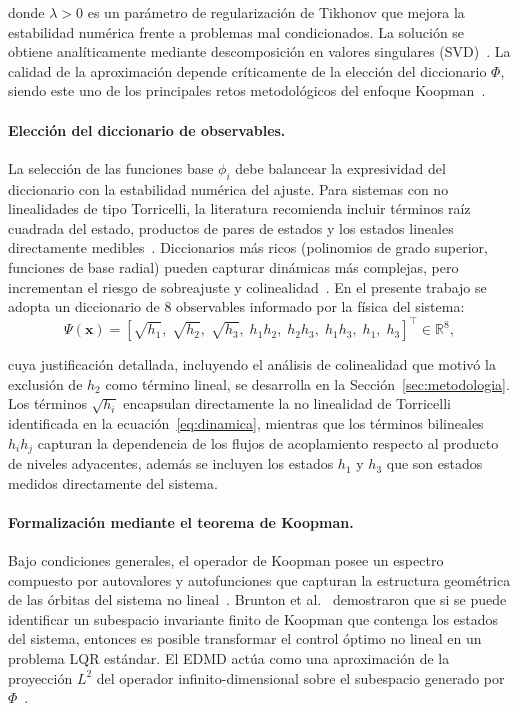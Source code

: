 \documentclass[12pt,letterpaper]{article}
\begin{document}
donde $\lambda > 0$ es un parámetro de regularización de Tikhonov que mejora la
estabilidad numérica frente a problemas mal condicionados. La solución se obtiene
analíticamente mediante descomposición en valores singulares (SVD)~\cite{schmid2010}.
La calidad de la aproximación depende críticamente de la elección del diccionario
$\Phi$, siendo este uno de los principales retos metodológicos del enfoque
Koopman~\cite{garciarev2025}.

\paragraph{Elección del diccionario de observables.}
La selección de las funciones base $\phi_i$ debe balancear la expresividad del
diccionario con la estabilidad numérica del ajuste. Para sistemas con no
linealidades de tipo Torricelli, la literatura recomienda incluir términos raíz
cuadrada del estado, productos de pares de estados y los estados lineales
directamente medibles~\cite{korda2018, aponte2024}. Diccionarios más ricos
(polinomios de grado superior, funciones de base radial) pueden capturar dinámicas
más complejas, pero incrementan el riesgo de sobreajuste y
colinealidad~\cite{garciarev2025}. En el presente trabajo se adopta un diccionario de
8 observables informado por la física del sistema:
\begin{equation}
\Psi(\mathbf{x}) = \left[ \sqrt{h_1},\; \sqrt{h_2},\; \sqrt{h_3},\; h_1h_2,\; h_2h_3,\; h_1h_3,\; h_1,\; h_3 \right]^\top \in \mathbb{R}^8,
\label{eq:psi_dict}
\end{equation}

cuya justificación detallada, incluyendo el análisis de colinealidad que motivó la
exclusión de $h_2$ como término lineal, se desarrolla en la
Sección~\ref{sec:metodologia}. Los términos $\sqrt{h_i}$ encapsulan directamente la
no linealidad de Torricelli identificada en la
ecuación~\eqref{eq:dinamica}, mientras que los términos bilineales $h_ih_j$ capturan
la dependencia de los flujos de acoplamiento respecto al producto de niveles
adyacentes, además se incluyen los estados $h_1$  y $h_3$ que son estados medidos directamente del sistema.

\paragraph{Formalización mediante el teorema de Koopman.}
Bajo condiciones generales, el operador de Koopman posee un espectro compuesto por
autovalores y autofunciones que capturan la estructura geométrica de las órbitas del
sistema no lineal~\cite{mezic2005}. Brunton et al.~\cite{brunton2016} demostraron que
si se puede identificar un subespacio invariante finito de Koopman que contenga los
estados del sistema, entonces es posible transformar el control óptimo no lineal en
un problema LQR estándar. El EDMD actúa como una aproximación de la proyección $L^2$
del operador infinito-dimensional sobre el subespacio generado por
$\Phi$~\cite{williams2015}.
\end{document}
